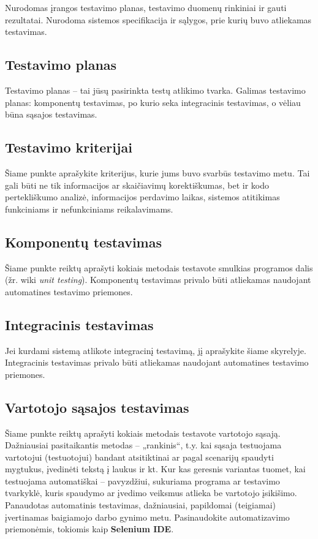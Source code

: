 \documentclass{ktuthesis}
\begin{document}
	Nurodomas įrangos testavimo planas, testavimo duomenų rinkiniai ir gauti rezultatai. Nurodoma sistemos specifikacija ir sąlygos, prie kurių
	buvo atliekamas testavimas.
	
	\subsection{Testavimo planas}
	
	Testavimo planas – tai jūsų pasirinkta testų atlikimo tvarka. Galimas testavimo planas: komponentų testavimas, po kurio seka integracinis
	testavimas, o vėliau būna sąsajos testavimas.
	
	\subsection{Testavimo kriterijai}
	
	Šiame punkte aprašykite kriterijus, kurie jums buvo svarbūs testavimo metu. Tai gali būti ne tik informacijos ar skaičiavimų korektiškumas,
	bet ir kodo pertekliškumo analizė, informacijos perdavimo laikas, sistemos atitikimas funkciniams ir nefunkciniams reikalavimams.
	
	\subsection{Komponentų testavimas}
	
	Šiame punkte reiktų aprašyti kokiais metodais testavote smulkias programos dalis (žr. wiki \textit{unit testing}). Komponentų testavimas privalo būti
	atliekamas naudojant automatines testavimo priemones.
	
	\subsection{Integracinis testavimas}
	
	Jei kurdami sistemą atlikote integracinį testavimą, jį aprašykite šiame skyrelyje. Integracinis testavimas privalo būti atliekamas naudojant automatines testavimo priemones.
	
	\subsection{Vartotojo sąsajos testavimas}
	
	Šiame punkte reiktų aprašyti kokiais metodais testavote vartotojo sąsają. Dažniausiai pasitaikantis metodas – „rankinis“, t.y. kai sąsaja testuojama
	vartotojui (testuotojui) bandant atsitiktinai ar pagal scenarijų spaudyti mygtukus, įvedinėti tekstą į laukus ir kt. Kur kas geresnis variantas tuomet,
	kai testuojama automatiškai – pavyzdžiui, sukuriama programa ar testavimo tvarkyklė, kuris spaudymo ar įvedimo veiksmus atlieka be vartotojo įsikišimo.
	Panaudotas automatinis testavimas, dažniausiai, papildomai (teigiamai) įvertinamas baigiamojo darbo gynimo metu. Pasinaudokite automatizavimo priemonėmis,
	tokiomis kaip \textbf{Selenium IDE}.
	
\end{document}

